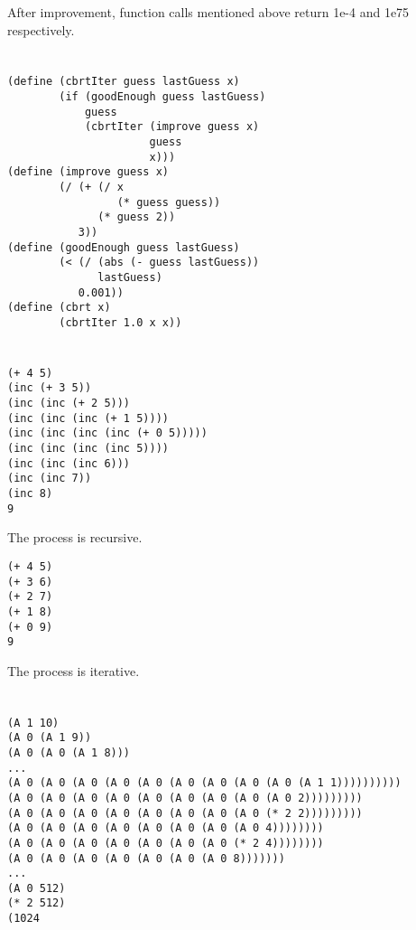 \documentclass[a4paper]{report}
\begin{document}
After improvement, function calls mentioned above return 1e-4 and 1e75 respectively.


\section{}

\begin{lstlisting}
(define (cbrtIter guess lastGuess x)
        (if (goodEnough guess lastGuess)
            guess
            (cbrtIter (improve guess x)
                      guess
                      x)))
(define (improve guess x)
        (/ (+ (/ x
                 (* guess guess))
              (* guess 2))
           3))
(define (goodEnough guess lastGuess)
        (< (/ (abs (- guess lastGuess))
              lastGuess)
           0.001))
(define (cbrt x)
        (cbrtIter 1.0 x x))
\end{lstlisting}


\section{}

\begin{lstlisting}
(+ 4 5)
(inc (+ 3 5))
(inc (inc (+ 2 5)))
(inc (inc (inc (+ 1 5))))
(inc (inc (inc (inc (+ 0 5)))))
(inc (inc (inc (inc 5))))
(inc (inc (inc 6)))
(inc (inc 7))
(inc 8)
9
\end{lstlisting}

The process is recursive.

\begin{lstlisting}
(+ 4 5)
(+ 3 6)
(+ 2 7)
(+ 1 8)
(+ 0 9)
9
\end{lstlisting}

The process is iterative.


\section{}

\begin{lstlisting}
(A 1 10)
(A 0 (A 1 9))
(A 0 (A 0 (A 1 8)))
...
(A 0 (A 0 (A 0 (A 0 (A 0 (A 0 (A 0 (A 0 (A 0 (A 1 1))))))))))
(A 0 (A 0 (A 0 (A 0 (A 0 (A 0 (A 0 (A 0 (A 0 2)))))))))
(A 0 (A 0 (A 0 (A 0 (A 0 (A 0 (A 0 (A 0 (* 2 2)))))))))
(A 0 (A 0 (A 0 (A 0 (A 0 (A 0 (A 0 (A 0 4))))))))
(A 0 (A 0 (A 0 (A 0 (A 0 (A 0 (A 0 (* 2 4))))))))
(A 0 (A 0 (A 0 (A 0 (A 0 (A 0 (A 0 8)))))))
...
(A 0 512)
(* 2 512)
(1024
\end{lstlisting}
\end{document}

